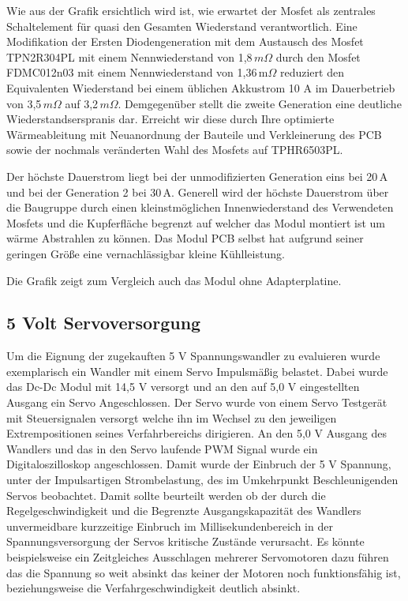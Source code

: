 Wie aus der Grafik ersichtlich wird ist, wie erwartet der Mosfet als zentrales Schaltelement für quasi den Gesamten Wiederstand verantwortlich.
Eine Modifikation der Ersten Diodengeneration mit dem Austausch des Mosfet TPN2R304PL mit einem Nennwiederstand von 1,8\,$m\Omega$ \cite{TPN2R304PL} durch den Mosfet FDMC012n03 mit einem Nennwiederstand von 1,36\,m$\Omega$ \cite{FDMC012N03} reduziert den Equivalenten Wiederstand bei einem üblichen Akkustrom 10 A im Dauerbetrieb von 3,5\,$m\Omega$  auf 3,2\,$m\Omega$.
Demgegenüber stellt die zweite Generation eine deutliche Wiederstandserspranis dar.
Erreicht wir diese durch Ihre optimierte Wärmeableitung mit Neuanordnung der Bauteile und Verkleinerung des PCB sowie der nochmals veränderten Wahl des Mosfets auf TPHR6503PL.

Der höchste Dauerstrom liegt bei der unmodifizierten Generation eins bei 20\,A und bei der Generation 2 bei 30\,A. 
Generell wird der höchste Dauerstrom über die Baugruppe durch einen kleinstmöglichen Innenwiederstand des Verwendeten Mosfets und die Kupferfläche begrenzt auf welcher das Modul montiert ist um wärme Abstrahlen zu können. Das Modul PCB selbst hat aufgrund seiner geringen Größe eine vernachlässigbar kleine Kühlleistung.

Die Grafik zeigt zum Vergleich auch das Modul ohne Adapterplatine.

\subsection{5 Volt Servoversorgung}

Um die Eignung der zugekauften 5 V Spannungswandler zu evaluieren wurde exemplarisch ein Wandler mit einem Servo Impulsmäßig belastet.
Dabei wurde das Dc-Dc Modul mit 14,5 V versorgt und an den auf 5,0 V eingestellten Ausgang ein Servo Angeschlossen. Der Servo wurde von einem Servo Testgerät mit Steuersignalen versorgt welche ihn im Wechsel zu den jeweiligen Extrempositionen seines Verfahrbereichs dirigieren. 
An den 5,0 V Ausgang des Wandlers und das in den Servo laufende PWM Signal wurde ein  Digitaloszilloskop angeschlossen. Damit  wurde der Einbruch der 5 V Spannung, unter der Impulsartigen Strombelastung, des im Umkehrpunkt Beschleunigenden Servos beobachtet.
Damit sollte beurteilt werden ob der durch die Regelgeschwindigkeit und die Begrenzte Ausgangskapazität des Wandlers unvermeidbare kurzzeitige Einbruch im Millisekundenbereich in der Spannungsversorgung der Servos kritische Zustände verursacht.
Es könnte beispielsweise ein Zeitgleiches Ausschlagen mehrerer Servomotoren dazu führen das die Spannung so weit absinkt das keiner der Motoren noch funktionsfähig ist, beziehungsweise die Verfahrgeschwindigkeit deutlich absinkt.

